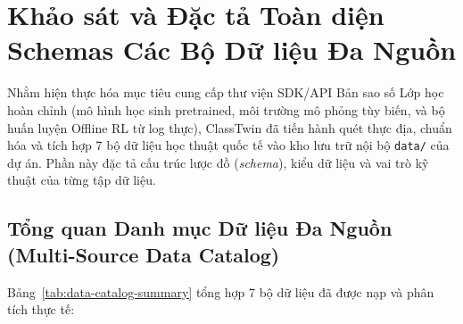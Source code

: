 \section{Khảo sát và Đặc tả Toàn diện Schemas Các Bộ Dữ liệu Đa Nguồn}\label{sec:data-schemas}

Nhằm hiện thực hóa mục tiêu cung cấp thư viện SDK/API Bản sao số Lớp học hoàn chỉnh (mô hình học sinh pretrained, môi trường mô phỏng tùy biến, và bộ huấn luyện Offline RL từ log thực), ClassTwin đã tiến hành quét thực địa, chuẩn hóa và tích hợp 7 bộ dữ liệu học thuật quốc tế vào kho lưu trữ nội bộ \texttt{data/} của dự án. Phần này đặc tả cấu trúc lược đồ (\textit{schema}), kiểu dữ liệu và vai trò kỹ thuật của từng tập dữ liệu.

\subsection{Tổng quan Danh mục Dữ liệu Đa Nguồn (Multi-Source Data Catalog)}\label{subsec:data-catalog-overview}
Bảng~\ref{tab:data-catalog-summary} tổng hợp 7 bộ dữ liệu đã được nạp và phân tích thực tế:


